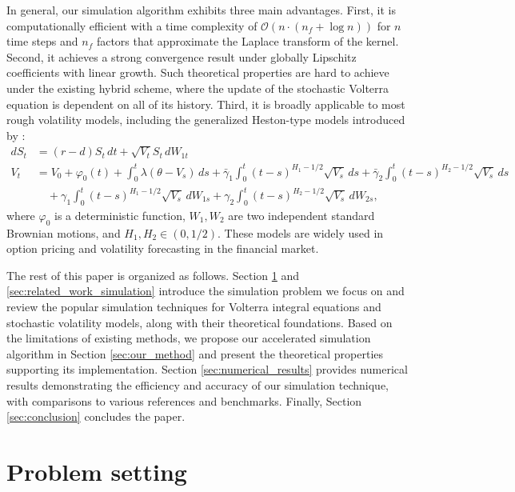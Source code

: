 \documentclass[11pt]{article}%
\theoremstyle{definition}
\begin{document}
In general, our simulation algorithm exhibits three main advantages. First, it is computationally efficient with a time complexity of \(\mathcal{O}(n\cdot(n_f +\log n))\) for \(n\) time steps and \(n_f\) factors that approximate the Laplace transform of the kernel. Second, it achieves a strong convergence result under globally Lipschitz coefficients with linear growth. Such theoretical properties are hard to achieve under the existing hybrid scheme, where the update of the stochastic Volterra equation is dependent on all of its history. Third, it is broadly applicable to most rough volatility models, including the generalized Heston-type models introduced by \cite{haogao2024}:
\begin{align}
    dS_t &= (r-d)S_t\,dt + \sqrt{V_t}S_t\,dW_{1t}\\
    V_t &= V_0 + \varphi_0(t) + \int_{0}^{t} \lambda(\theta-V_s)\,ds 
    + \bar{\gamma}_1 \int_{0}^{t} (t-s)^{H_1 - 1/2}\sqrt{V_s}\,ds + \bar{\gamma}_2 \int_{0}^{t} (t-s)^{H_2 - 1/2}\sqrt{V_s}\,ds \nonumber\\
    &\quad {} + \gamma_1 \int_{0}^{t} (t-s)^{H_1 - 1/2}\sqrt{V_s}\,dW_{1s} 
    + \gamma_2 \int_{0}^{t} (t-s)^{H_2 - 1/2}\sqrt{V_s}\,dW_{2s},\label{eq:generalized_heston}
\end{align}
where \(\varphi_0\) is a deterministic function, \(W_1,W_2\) are two independent standard Brownian motions, and \(H_1,H_2\in (0,1/2)\). These models are widely used in option pricing and volatility forecasting in the financial market.

The rest of this paper is organized as follows. Section \ref{sec:problem_setting} and \ref{sec:related_work_simulation} introduce the simulation problem we focus on and review the popular simulation techniques for Volterra integral equations and stochastic volatility models, along with their theoretical foundations. Based on the limitations of existing methods, we propose our accelerated simulation algorithm in Section \ref{sec:our_method} and present the theoretical properties supporting its implementation. Section \ref{sec:numerical_results} provides numerical results demonstrating the efficiency and accuracy of our simulation technique, with comparisons to various references and benchmarks. Finally, Section \ref{sec:conclusion} concludes the paper.

\section{Problem setting}\label{sec:problem_setting}
\end{document}
